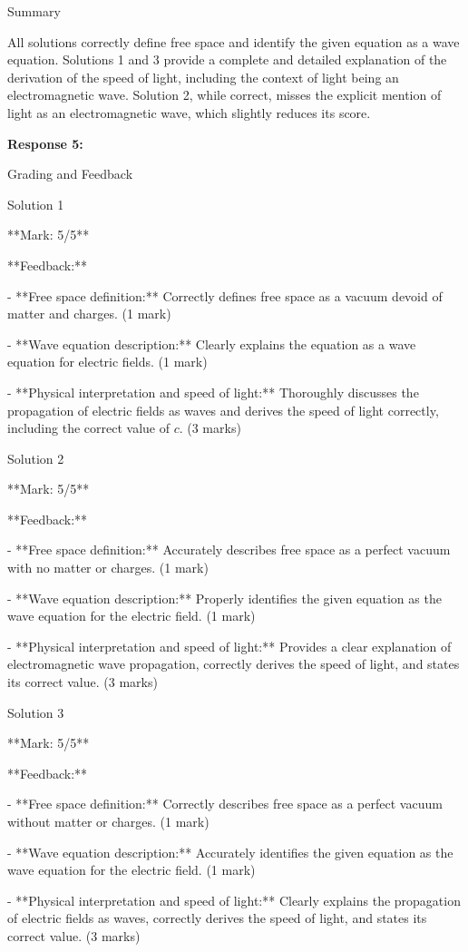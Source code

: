 \documentclass[a4paper,11pt]{article}
\begin{document}
Summary

All solutions correctly define free space and identify the given equation as a wave equation. Solutions 1 and 3 provide a complete and detailed explanation of the derivation of the speed of light, including the context of light being an electromagnetic wave. Solution 2, while correct, misses the explicit mention of light as an electromagnetic wave, which slightly reduces its score.

\bigskip    
\textbf{Response 5:}

Grading and Feedback

Solution 1

**Mark: 5/5**

**Feedback:**

- **Free space definition:** Correctly defines free space as a vacuum devoid of matter and charges. (1 mark)

- **Wave equation description:** Clearly explains the equation as a wave equation for electric fields. (1 mark)

- **Physical interpretation and speed of light:** Thoroughly discusses the propagation of electric fields as waves and derives the speed of light correctly, including the correct value of \(c\). (3 marks)

Solution 2

**Mark: 5/5**

**Feedback:**

- **Free space definition:** Accurately describes free space as a perfect vacuum with no matter or charges. (1 mark)

- **Wave equation description:** Properly identifies the given equation as the wave equation for the electric field. (1 mark)

- **Physical interpretation and speed of light:** Provides a clear explanation of electromagnetic wave propagation, correctly derives the speed of light, and states its correct value. (3 marks)

Solution 3

**Mark: 5/5**

**Feedback:**

- **Free space definition:** Correctly describes free space as a perfect vacuum without matter or charges. (1 mark)

- **Wave equation description:** Accurately identifies the given equation as the wave equation for the electric field. (1 mark)

- **Physical interpretation and speed of light:** Clearly explains the propagation of electric fields as waves, correctly derives the speed of light, and states its correct value. (3 marks)
\end{document}
